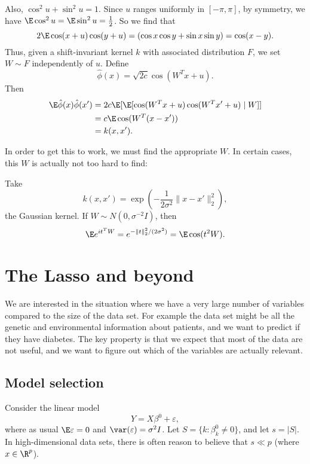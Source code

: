 \documentclass[a4paper]{article}
\begin{document}
Also, $\cos^2 u + \sin^2 u = 1$. Since $u$ ranges uniformly in $[-\pi, \pi]$, by symmetry, we have $\E \cos^2 u = \E \sin^2 u = \frac{1}{2}$. So we find that
\[
  2 \E \cos(x + u) \cos (y + u) = (\cos x \cos y + \sin x \sin y) = \cos (x - y).
\]
Thus, given a shift-invariant kernel $k$ with associated distribution $F$, we set $W \sim F$ independently of $u$. Define
\[
  \hat{\phi}(x) = \sqrt{2c} \cos (W^T x + u).
\]
Then
\begin{align*}
  \E \hat{\phi}(x) \hat{\phi}(x') &= 2c \E[\E[\cos (W^T x + u) \cos (W^T x' + u) \mid W]]\\
  &= c \E \cos(W^T (x - x'))\\
  &= k(x, x').
\end{align*}

In order to get this to work, we must find the appropriate $W$. In certain cases, this $W$ is actually not too hard to find:
\begin{eg}
  Take
  \[
    k(x, x') = \exp\left(-\frac{1}{2\sigma^2} \|x - x'\|_2^2\right),
  \]
  the Gaussian kernel. If $W \sim N(0, \sigma^{-2} I)$, then
  \[
    \E e^{it^TW} = e^{-\|t\|_2^2/(2\sigma^2)} = \E \cos(t^2 W).
  \]
\end{eg}

\section{The Lasso and beyond}
We are interested in the situation where we have a very large number of variables compared to the size of the data set. For example the data set might be all the genetic and environmental information about patients, and we want to predict if they have diabetes. The key property is that we expect that most of the data are not useful, and we want to figure out which of the variables are actually relevant. %

\subsection{Model selection}
Consider the linear model
\[
  Y = X \beta^0 + \varepsilon,
\]
where as usual $\E \varepsilon = 0$ and $\var(\varepsilon) = \sigma^2 I$. Let $S = \{k : \beta^0_k \not= 0\}$, and let $s = |S|$. In high-dimensional data sets, there is often reason to believe that $s \ll p$ (where $x \in \R^p$).
\end{document}
